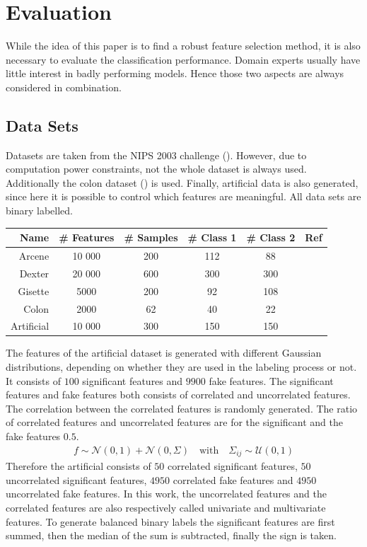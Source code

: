 \documentclass[twoside,11pt]{article}
\begin{document}
\section{Evaluation}

While the idea of this paper is to find a robust feature selection method, it is also necessary to evaluate the classification performance. Domain experts usually have little interest in badly performing models. Hence those two aspects are always considered in combination.

\subsection{Data Sets}
Datasets are taken from the NIPS 2003 challenge (\cite{NIPS}). However, due to computation power constraints, not the whole dataset is always used. Additionally the colon dataset (\cite{alon1999broad}) is used. Finally, artificial data is also generated, since here it is possible to control which features are meaningful. All data sets are binary labelled.

\begin{center}
    \begin{tabular}{| r | c | c | c | c | c |}
    \hline
    Name & \# Features & \# Samples & \# Class 1 & \# Class 2 & Ref\\ \hline
    Arcene & 10 000 & 200 & 112 & 88 & \cite{NIPS} \\
    Dexter & 20 000 & 600 & 300 & 300 & \cite{NIPS} \\
    Gisette & 5000 & 200 & 92 & 108 & \cite{NIPS} \\
    Colon & 2000 & 62 & 40 & 22 &  \cite{alon1999broad} \\
    Artificial & 10 000 & 300 & 150 & 150 & \\
    \hline
    \end{tabular}
\end{center}

The features of the artificial dataset is generated with different Gaussian distributions, depending on whether they are used in the labeling process or not. It consists of $100$ significant features and $9900$ fake features. The significant features and fake features both consists of correlated and uncorrelated features. The correlation between the correlated features is randomly generated. The ratio of correlated features and uncorrelated features are for the significant and the fake features $0.5$. 
\begin{align}
f \sim \mathcal{N}(0, 1) + \mathcal{N}(0, \Sigma)  \quad \text{with} \quad \Sigma_{ij} \sim \mathcal{U}(0,1)
\end{align}
Therefore the artificial consists of $50$ correlated significant features, $50$ uncorrelated significant features, $4950$ correlated fake features and $4950$ uncorrelated fake features. In this work, the uncorrelated features and the correlated features are also respectively called univariate and  multivariate features.
To generate balanced binary labels the significant features are first summed, then the median of the sum is subtracted, finally the sign is taken. 
\end{document}

